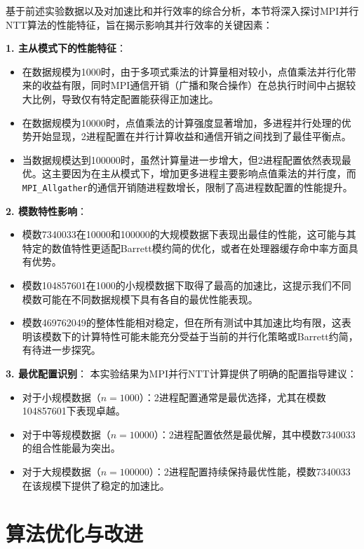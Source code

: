 \documentclass[a4paper]{article}
\begin{document}
基于前述实验数据以及对加速比和并行效率的综合分析，本节将深入探讨MPI并行NTT算法的性能特征，旨在揭示影响其并行效率的关键因素：

\textbf{1. 主从模式下的性能特征}：
\begin{itemize}
  \item 在数据规模为1000时，由于多项式乘法的计算量相对较小，点值乘法并行化带来的收益有限，同时MPI通信开销（广播和聚合操作）在总执行时间中占据较大比例，导致仅有特定配置能获得正加速比。
  \item 在数据规模为10000时，点值乘法的计算强度显著增加，多进程并行处理的优势开始显现，2进程配置在并行计算收益和通信开销之间找到了最佳平衡点。
  \item 当数据规模达到100000时，虽然计算量进一步增大，但2进程配置依然表现最优。这主要因为在主从模式下，增加更多进程主要影响点值乘法的并行度，而\texttt{MPI\_Allgather}的通信开销随进程数增长，限制了高进程数配置的性能提升。
\end{itemize}

\textbf{2. 模数特性影响}：
\begin{itemize}
  \item 模数7340033在10000和100000的大规模数据下表现出最佳的性能，这可能与其特定的数值特性更适配Barrett模约简的优化，或者在处理器缓存命中率方面具有优势。
  \item 模数104857601在1000的小规模数据下取得了最高的加速比，这提示我们不同模数可能在不同数据规模下具有各自的最优性能表现。
  \item 模数469762049的整体性能相对稳定，但在所有测试中其加速比均有限，这表明该模数下的计算特性可能未能充分受益于当前的并行化策略或Barrett约简，有待进一步探究。
\end{itemize}

\textbf{3. 最优配置识别}：
本实验结果为MPI并行NTT计算提供了明确的配置指导建议：
\begin{itemize}
  \item 对于小规模数据（$n=1000$）：2进程配置通常是最优选择，尤其在模数104857601下表现卓越。
  \item 对于中等规模数据（$n=10000$）：2进程配置依然是最优解，其中模数7340033的组合性能最为突出。
  \item 对于大规模数据（$n=100000$）：2进程配置持续保持最优性能，模数7340033在该规模下提供了稳定的加速比。
\end{itemize}

\section{算法优化与改进}
\end{document}
